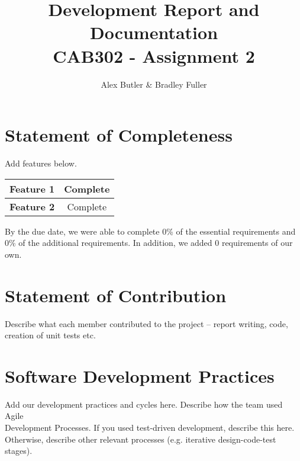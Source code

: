 \documentclass[12pt]{article} %
\begin{document}

\title{Development Report and Documentation
		 \\ \large CAB302 - Assignment 2}

\author {Alex Butler \& Bradley Fuller}
\maketitle

\tableofcontents

\newpage

\section{Statement of Completeness}

Add features below. 
\begin{center}
	\begin{tabular}{|c|c|}
		\hline  \textbf{Feature 1} & Complete \\
		\hline  \textbf{Feature 2} & Complete  \\
		\hline
	\end{tabular}
\end{center}
By the due date, we were able to complete 0\% of the essential requirements and 0\% of the additional requirements. In addition, we added 0 requirements of our own.

\newpage

\section{Statement of Contribution}

Describe what each member contributed to the project – report writing, code, creation of unit tests etc.

\newpage

\section{Software Development Practices}

Add our development practices and cycles here. Describe how the team used Agile \\
Development Processes. If you used test-driven development, describe this here.\\
Otherwise, describe other relevant processes (e.g. iterative design-code-test stages).

\newpage
\end{document}

